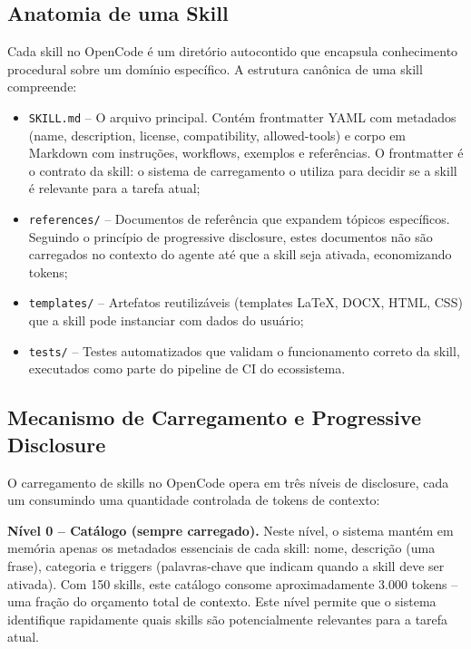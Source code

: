 \documentclass[12pt,a4paper,sumario=tradicional,openany]{abntex2}
\begin{document}
\subsection{Anatomia de uma Skill}

Cada skill no OpenCode é um diretório autocontido que encapsula conhecimento procedural sobre um domínio específico. A estrutura canônica de uma skill compreende:

\begin{itemize}
    \item \texttt{SKILL.md} -- O arquivo principal. Contém frontmatter YAML com metadados (name, description, license, compatibility, allowed-tools) e corpo em Markdown com instruções, workflows, exemplos e referências. O frontmatter é o contrato da skill: o sistema de carregamento o utiliza para decidir se a skill é relevante para a tarefa atual;
    \item \texttt{references/} -- Documentos de referência que expandem tópicos específicos. Seguindo o princípio de progressive disclosure, estes documentos não são carregados no contexto do agente até que a skill seja ativada, economizando tokens;
    \item \texttt{templates/} -- Artefatos reutilizáveis (templates LaTeX, DOCX, HTML, CSS) que a skill pode instanciar com dados do usuário;
    \item \texttt{tests/} -- Testes automatizados que validam o funcionamento correto da skill, executados como parte do pipeline de CI do ecossistema.
\end{itemize}

\subsection{Mecanismo de Carregamento e Progressive Disclosure}

O carregamento de skills no OpenCode opera em três níveis de disclosure, cada um consumindo uma quantidade controlada de tokens de contexto:

\textbf{Nível 0 -- Catálogo (sempre carregado).} Neste nível, o sistema mantém em memória apenas os metadados essenciais de cada skill: nome, descrição (uma frase), categoria e triggers (palavras-chave que indicam quando a skill deve ser ativada). Com 150 skills, este catálogo consome aproximadamente 3.000 tokens -- uma fração do orçamento total de contexto. Este nível permite que o sistema identifique rapidamente quais skills são potencialmente relevantes para a tarefa atual.
\end{document}
